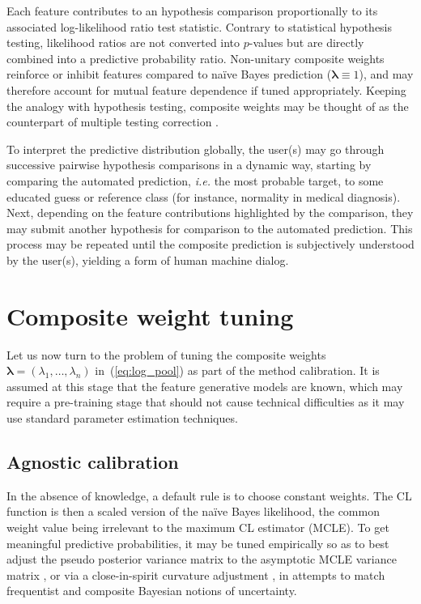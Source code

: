 \documentclass[english]{scrartcl}
\newcommand{\blambda}{{\boldsymbol{\lambda}}}
\begin{document}
Each feature contributes to an hypothesis comparison proportionally to its associated log-likelihood ratio test statistic. Contrary to statistical hypothesis testing, likelihood ratios are not converted into $p$-values but are directly combined into a predictive probability ratio. Non-unitary composite weights reinforce or inhibit features compared to na\"ive Bayes prediction ($\blambda\equiv 1$), and may therefore account for mutual feature dependence if tuned appropriately. Keeping the analogy with hypothesis testing, composite weights may be thought of as the counterpart of multiple testing correction \cite{Benjamini-10}.

To interpret the predictive distribution globally, the user(s) may go through successive pairwise hypothesis comparisons in a dynamic way, starting by comparing the automated prediction, {\em i.e.} the most probable target, to some educated guess or reference class (for instance, normality in medical diagnosis). Next, depending on the feature contributions highlighted by the comparison, they may submit another hypothesis for comparison to the automated prediction. This process may be repeated until the composite prediction is subjectively understood by the user(s), yielding a form of human machine dialog.



\section{Composite weight tuning}
\label{sec:weight_tuning}


Let us now turn to the problem of tuning the composite weights~$\blambda=(\lambda_1,\ldots,\lambda_n)$ in~(\ref{eq:log_pool}) as part of the method calibration. It is assumed at this stage that the feature generative models are known, which may require a pre-training stage that should not cause technical difficulties as it may use standard parameter estimation techniques. 


\subsection{Agnostic calibration}

In the absence of knowledge, a default rule is to choose constant weights. The CL function is then a scaled version of the na\"ive Bayes likelihood, the common weight value being irrelevant to the maximum CL estimator (MCLE). To get meaningful predictive probabilities, it may be tuned empirically so as to best adjust the pseudo posterior variance matrix to the asymptotic MCLE variance matrix \cite{Pauli-11}, or via a close-in-spirit curvature adjustment \cite{Ribatet-12}, in attempts to match frequentist and composite Bayesian notions of uncertainty.
\end{document}
